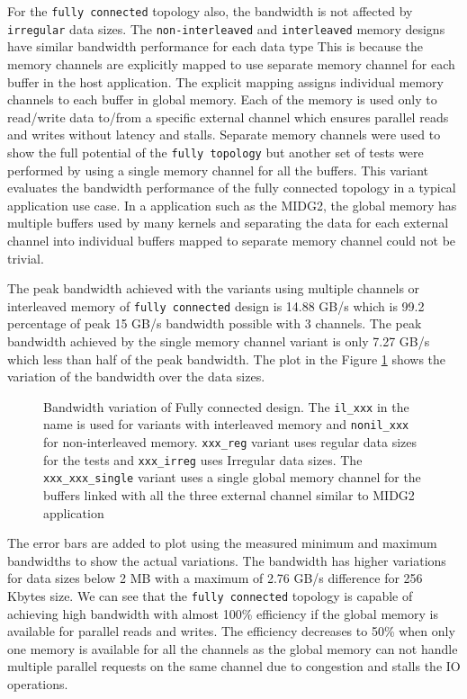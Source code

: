 For the \texttt{fully connected} topology also, the bandwidth is not affected by \texttt{irregular} data sizes.
The \texttt{non-interleaved} and \texttt{interleaved} memory designs have similar bandwidth performance for each data type
This is because the memory channels are explicitly mapped to use separate memory channel for each buffer in the host application.
The explicit mapping assigns individual memory channels to each buffer in global memory. Each of the memory
is used only to read/write data to/from a specific external channel which ensures parallel reads
and writes without latency and stalls. Separate memory channels were used to show the full potential
of the \texttt{fully topology} but another set of tests were performed by using a single memory
channel for all the buffers. This variant evaluates the bandwidth performance of the fully connected
topology in a typical application use case. In a application such as the MIDG2, the global memory
has multiple buffers used by many kernels and separating the data for each external channel into individual
buffers mapped to separate memory channel could not be trivial.

The peak bandwidth achieved with the variants using multiple channels or interleaved memory of \texttt{fully connected}
design is 14.88 GB/s which is 99.2 percentage of peak 15 GB/s bandwidth possible with 3 channels.
The peak bandwidth achieved by the single memory channel variant is only 7.27 GB/s which less than
half of the peak bandwidth. The plot in the Figure \ref{plot:fc} shows the variation of the bandwidth over the data sizes.
\begin{figure}[ht]
    \centering
    \scalebox{0.7}{}
    \caption{Bandwidth variation of Fully connected design.
    The \texttt{il\_xxx} in the name is used for variants with interleaved memory and \texttt{nonil\_xxx} for non-interleaved memory.
    \texttt{xxx\_reg} variant uses regular data sizes for the tests and \texttt{xxx\_irreg} uses Irregular data sizes.
    The \texttt{xxx\_xxx\_single} variant uses a single global memory channel for the buffers linked with all the
    three external channel similar to MIDG2 application }
    \label{plot:fc}
\end{figure}
The error bars are added to plot using the measured minimum and maximum bandwidths to show the actual
variations. The bandwidth has higher variations for data sizes below 2 MB with a maximum of 2.76 GB/s
difference for 256 Kbytes size. We can see that the \texttt{fully connected} topology is capable of
achieving high bandwidth with almost 100\% efficiency if the global memory is available for parallel
reads and writes. The efficiency decreases to 50\% when only one memory is available for all the channels
as the global memory can not handle multiple parallel requests on the same channel due to congestion
and stalls the IO operations.

